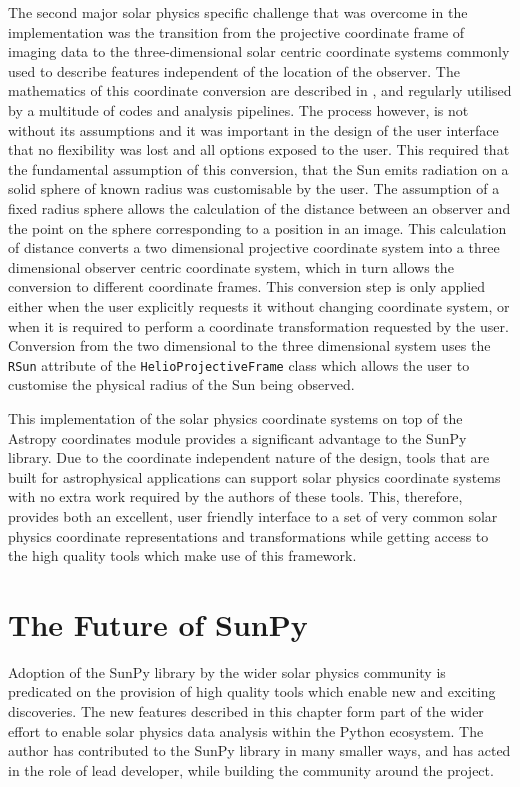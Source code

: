\documentclass[a4paper,12pt,fourier,authoryear,custommargin]{Classes/PhDThesisPSnPDF}
\begin{document}
The second major solar physics specific challenge that was overcome in the implementation was the transition from the projective coordinate frame of imaging data to the three-dimensional solar centric coordinate systems commonly used to describe features independent of the location of the observer.
The mathematics of this coordinate conversion are described in \cite{thompson2006}, and regularly utilised by a multitude of codes and analysis pipelines.
The process however, is not without its assumptions and it was important in the design of the user interface that no flexibility was lost and all options exposed to the user.
This required that the fundamental assumption of this conversion, that the Sun emits radiation on a solid sphere of known radius was customisable by the user.
The assumption of a fixed radius sphere allows the calculation of the distance between an observer and the point on the sphere corresponding to a position in an image.
This calculation of distance converts a two dimensional projective coordinate system into a three dimensional observer centric coordinate system, which in turn allows the conversion to different coordinate frames.
This conversion step is only applied either when the user explicitly requests it without changing coordinate system, or when it is required to perform a coordinate transformation requested by the user.
Conversion from the two dimensional to the three dimensional system uses the \verb|RSun| attribute of the \verb|HelioProjectiveFrame| class which allows the user to customise the physical radius of the Sun being observed.

This implementation of the solar physics coordinate systems on top of the Astropy coordinates module provides a significant advantage to the SunPy library.
Due to the coordinate independent nature of the design, tools that are built for astrophysical applications can support solar physics coordinate systems with no extra work required by the authors of these tools.
This, therefore, provides both an excellent, user friendly interface to a set of very common solar physics coordinate representations and transformations while getting access to the high quality tools which make use of this framework.

\section{The Future of SunPy}

Adoption of the SunPy library by the wider solar physics community is predicated on the provision of high quality tools which enable new and exciting discoveries.
The new features described in this chapter form part of the wider effort to enable solar physics data analysis within the Python ecosystem.
The author has contributed to the SunPy library in many smaller ways, and has acted in the role of lead developer, while building the community around the project.
\end{document}
